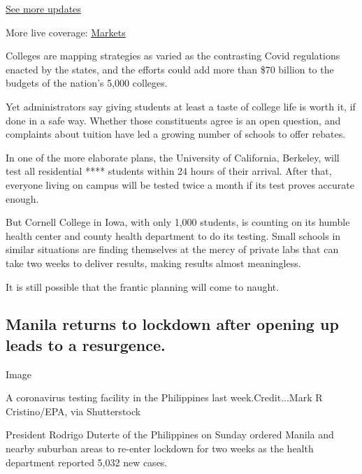\href{https://www.nytimes3xbfgragh.onion/2020/08/03/world/coronavirus-covid-19.html?action=click\&pgtype=Article\&state=default\&region=MAIN_CONTENT_1\&context=storylines_live_updates}{See
more updates}

More live coverage:
\href{https://www.nytimes3xbfgragh.onion/live/2020/08/03/business/stock-market-today-coronavirus?action=click\&pgtype=Article\&state=default\&region=MAIN_CONTENT_1\&context=storylines_live_updates}{Markets}

Colleges are mapping strategies as varied as the contrasting Covid
regulations enacted by the states, and the efforts could add more than
\$70 billion to the budgets of the nation's 5,000 colleges.

Yet administrators say giving students at least a taste of college life
is worth it, if done in a safe way. Whether those constituents agree is
an open question, and complaints about tuition have led a growing number
of schools to offer rebates.

In one of the more elaborate plans, the University of California,
Berkeley, will test all residential **** students within 24 hours of
their arrival. After that, everyone living on campus will be tested
twice a month if its test proves accurate enough.

But Cornell College in Iowa, with only 1,000 students, is counting on
its humble health center and county health department to do its testing.
Small schools in similar situations are finding themselves at the mercy
of private labs that can take two weeks to deliver results, making
results almost meaningless.

It is still possible that the frantic planning will come to naught.

\hypertarget{manila-returns-to-lockdown-after-opening-up-leads-to-a-resurgence}{%
\subsection{Manila returns to lockdown after opening up leads to a
resurgence.}\label{manila-returns-to-lockdown-after-opening-up-leads-to-a-resurgence}}

Image

A coronavirus testing facility in the Philippines last
week.Credit...Mark R Cristino/EPA, via Shutterstock

President Rodrigo Duterte of the Philippines on Sunday ordered Manila
and nearby suburban areas to re-enter lockdown for two weeks as the
health department reported 5,032 new cases.

